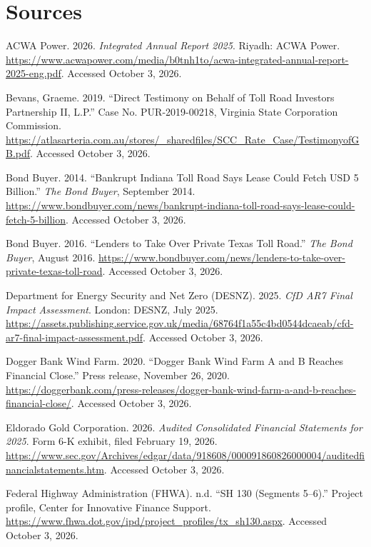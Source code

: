 \section*{Sources}
\begin{sloppypar}
\begin{sources}
\item ACWA Power. 2026. \textit{Integrated Annual Report 2025}. Riyadh: ACWA Power. \url{https://www.acwapower.com/media/b0tnh1to/acwa-integrated-annual-report-2025-eng.pdf}. Accessed October 3, 2026.
\item Bevans, Graeme. 2019. ``Direct Testimony on Behalf of Toll Road Investors Partnership II, L.P.'' Case No. PUR-2019-00218, Virginia State Corporation Commission. \url{https://atlasarteria.com.au/stores/_sharedfiles/SCC_Rate_Case/TestimonyofGB.pdf}. Accessed October 3, 2026.
\item Bond Buyer. 2014. ``Bankrupt Indiana Toll Road Says Lease Could Fetch USD 5 Billion.'' \textit{The Bond Buyer}, September 2014. \url{https://www.bondbuyer.com/news/bankrupt-indiana-toll-road-says-lease-could-fetch-5-billion}. Accessed October 3, 2026.
\item Bond Buyer. 2016. ``Lenders to Take Over Private Texas Toll Road.'' \textit{The Bond Buyer}, August 2016. \url{https://www.bondbuyer.com/news/lenders-to-take-over-private-texas-toll-road}. Accessed October 3, 2026.
\item Department for Energy Security and Net Zero (DESNZ). 2025. \textit{CfD AR7 Final Impact Assessment}. London: DESNZ, July 2025. \url{https://assets.publishing.service.gov.uk/media/68764f1a55c4bd0544dcaeab/cfd-ar7-final-impact-assessment.pdf}. Accessed October 3, 2026.
\item Dogger Bank Wind Farm. 2020. ``Dogger Bank Wind Farm A and B Reaches Financial Close.'' Press release, November 26, 2020. \url{https://doggerbank.com/press-releases/dogger-bank-wind-farm-a-and-b-reaches-financial-close/}. Accessed October 3, 2026.
\item Eldorado Gold Corporation. 2026. \textit{Audited Consolidated Financial Statements for 2025}. Form 6-K exhibit, filed February 19, 2026. \url{https://www.sec.gov/Archives/edgar/data/918608/000091860826000004/auditedfinancialstatements.htm}. Accessed October 3, 2026.
\item Federal Highway Administration (FHWA). n.d. ``SH 130 (Segments 5--6).'' Project profile, Center for Innovative Finance Support. \url{https://www.fhwa.dot.gov/ipd/project_profiles/tx_sh130.aspx}. Accessed October 3, 2026.

\end{sources}
\end{sloppypar}
